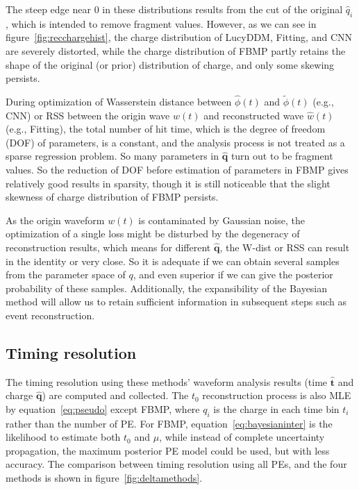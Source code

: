 The steep edge near 0 in these distributions results from the cut of the original $\hat{q}_i$, which is intended to remove fragment values. However, as we can see in figure~\ref{fig:recchargehist}, the charge distribution of LucyDDM, Fitting, and CNN are severely distorted, while the charge distribution of FBMP partly retains the shape of the original (or prior) distribution of charge, and only some skewing persists. 

During optimization of Wasserstein distance between $\hat{\phi}(t)$ and $\tilde{\phi}(t)$ (e.g., CNN) or RSS between the origin wave $w(t)$ and reconstructed wave $\hat{w}(t)$ (e.g., Fitting), the total number of hit time, which is the degree of freedom (DOF) of parameters, is a constant, and the analysis process is not treated as a sparse regression problem. So many parameters in $\bm{\hat{q}}$ turn out to be fragment values. So the reduction of DOF before estimation of parameters in FBMP gives relatively good results in sparsity, though it is still noticeable that the slight skewness of charge distribution of FBMP persists. 


As the origin waveform $w(t)$ is contaminated by Gaussian noise, the optimization of a single loss might be disturbed by the degeneracy of reconstruction results, which means for different $\bm{\hat{q}}$, the W-dist or RSS can result in the identity or very close. So it is adequate if we can obtain several samples from the parameter space of $q$, and even superior if we can give the posterior probability of these samples. Additionally, the expansibility of the Bayesian method will allow us to retain sufficient information in subsequent steps such as event reconstruction. 

\subsection{Timing resolution}
\label{subsec:timeresolution}


The timing resolution using these methods' waveform analysis results (time $\bm{\hat{t}}$ and charge $\bm{\hat{q}}$) are computed and collected. The $t_{0}$ reconstruction process is also MLE by equation~\eqref{eq:pseudo} except FBMP, where $q_{i}$ is the charge in each time bin $t_{i}$ rather than the number of PE. For FBMP, equation~\eqref{eq:bayesianinter} is the likelihood to estimate both $t_{0}$ and $\mu$, while instead of complete uncertainty propagation, the maximum posterior PE model could be used, but with less accuracy. The comparison between timing resolution using all PEs, and the four methods is shown in figure~\ref{fig:deltamethods}. 

